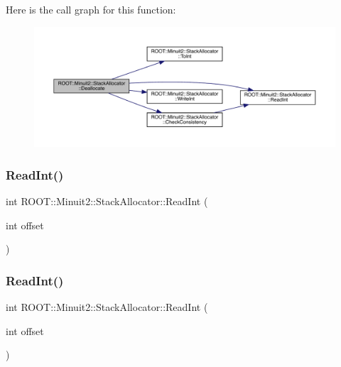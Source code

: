 Here is the call graph for this function\+:
\nopagebreak
\begin{figure}[H]
\begin{center}
\leavevmode
\includegraphics[width=350pt]{d3/d1e/classROOT_1_1Minuit2_1_1StackAllocator_ac36426e01e1474491cef1b203dba2f0c_cgraph}
\end{center}
\end{figure}
\mbox{\label{classROOT_1_1Minuit2_1_1StackAllocator_a811df825be4e6f67dc5a9139eb2edfdd}} 
\subsubsection{\texorpdfstring{ReadInt()}{ReadInt()}\hspace{0.1cm}{\footnotesize\ttfamily [1/3]}}
{\footnotesize\ttfamily int R\+O\+O\+T\+::\+Minuit2\+::\+Stack\+Allocator\+::\+Read\+Int (\begin{DoxyParamCaption}\item[{int}]{offset }\end{DoxyParamCaption})\hspace{0.3cm}{\ttfamily [inline]}}

\mbox{\label{classROOT_1_1Minuit2_1_1StackAllocator_a811df825be4e6f67dc5a9139eb2edfdd}} 
\subsubsection{\texorpdfstring{ReadInt()}{ReadInt()}\hspace{0.1cm}{\footnotesize\ttfamily [2/3]}}
{\footnotesize\ttfamily int R\+O\+O\+T\+::\+Minuit2\+::\+Stack\+Allocator\+::\+Read\+Int (\begin{DoxyParamCaption}\item[{int}]{offset }\end{DoxyParamCaption})\hspace{0.3cm}{\ttfamily [inline]}}

